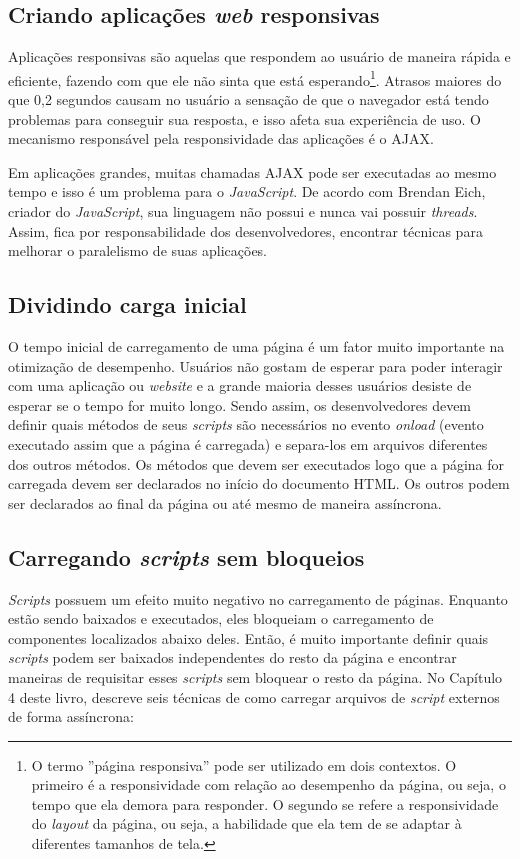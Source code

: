 \subsection{Criando aplicações \textit{web} responsivas}
\label{subsec:evenfaster_cap2}
Aplicações responsivas são aquelas que respondem ao usuário de maneira rápida e eficiente, fazendo com que ele não sinta que está esperando\footnote{O termo ''página responsiva'' pode ser utilizado em dois contextos. O primeiro é a responsividade com relação ao desempenho da página, ou seja, o tempo que ela demora para responder. O segundo se refere a responsividade do \textit{layout} da página, ou seja, a habilidade que ela tem de se adaptar à diferentes tamanhos de tela.}. Atrasos maiores do que 0,2 segundos causam no usuário a sensação de que o navegador está tendo problemas para conseguir sua resposta, e isso afeta sua experiência de uso. O mecanismo responsável pela responsividade das aplicações é o AJAX.

Em aplicações grandes, muitas chamadas AJAX pode ser executadas ao mesmo tempo e isso é um problema para o \textit{JavaScript}. De acordo com Brendan Eich, criador do \textit{JavaScript}, sua linguagem não possui e nunca vai possuir \textit{threads}. Assim, fica por responsabilidade dos desenvolvedores, encontrar técnicas para melhorar o paralelismo de suas aplicações.

\subsection{Dividindo carga inicial}
\label{subsec:evenfaster_cap3}
O tempo inicial de carregamento de uma página é um fator muito importante na otimização de desempenho. Usuários não gostam de esperar para poder interagir com uma aplicação ou \textit{website} e a grande maioria desses usuários desiste de esperar se o tempo for muito longo. Sendo assim, os desenvolvedores devem definir quais métodos de seus \textit{scripts} são necessários no evento \textit{onload} (evento executado assim que a página é carregada) e separa-los em arquivos diferentes dos outros métodos. Os métodos que devem ser executados logo que a página for carregada devem ser declarados no início do documento HTML. Os outros podem ser declarados ao final da página ou até mesmo de maneira assíncrona.

\subsection{Carregando \textit{scripts} sem bloqueios}
\label{subsec:evenfaster_cap4}
\textit{Scripts} possuem um efeito muito negativo no carregamento de páginas. Enquanto estão sendo baixados e executados, eles bloqueiam o carregamento de componentes localizados abaixo deles. Então, é muito importante definir quais \textit{scripts} podem ser baixados independentes do resto da página e encontrar maneiras de requisitar esses \textit{scripts} sem bloquear o resto da página. No Capítulo 4 deste livro,  descreve seis técnicas de como carregar arquivos de \textit{script} externos de forma assíncrona:

